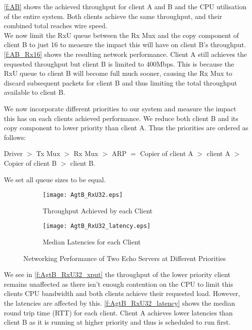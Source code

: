 \autoref{f:AB} shows the achieved throughput for client A and B and the CPU utilisation of the entire system. 
Both clients achieve the same throughput, and their combined total reaches wire speed.\\

We now limit the RxU queue between the Rx Mux and the copy component of client B to just 16 to measure 
the impact this will have on client B's throughput. \autoref{f:AB_Rx16} shows the resulting network performance.
Client A still achieves the requested throughput but client B is limited to 400Mbps. This is because the RxU queue
to client B will become full much sooner, causing the Rx Mux to discard subsequent packets for client B and thus
limiting the total throughput available to client B. 

We now incorporate different priorities to our system and measure the impact this has on each clients
achieved performance. We reduce both client B and its copy component to lower priority than client A. 
Thus the priorities are ordered as follows:\\ 

\centerline{Driver \(>\) Tx Mux  \(>\) Rx Mux \(>\) ARP \(=\) Copier of client A \(>\) client A \(>\) Copier of client B \(>\) client B.}

We set all queue sizes to be equal. 

\noindent\begin{figure}[H]
    \centering
	\begin{multicols}{2}
		\begin{subfigure}[b]{0.45\textwidth}
        \centering
        \texttt{[image: AgtB\_RxU32.eps]}
        \caption{Throughput Achieved by each Client}
        \label{f:AgtB_RxU32_xput}
    \end{subfigure}\qquad
    \begin{subfigure}[b]{0.45\textwidth}
        \vspace{39pt}
        \centering
        \texttt{[image: AgtB\_RxU32\_latency.eps]}
        \caption{Median Latencies for each Client}
        \label{f:AgtB_RxU32_latency}
    \end{subfigure}
\end{multicols}
\caption{Networking Performance of Two Echo Servers at Different Priorities}
\label{f:AgtB_RxU32}
\end{figure}

We see in \autoref{f:AgtB_RxU32_xput} the throughput of the lower priority client remains unaffected as there isn't enough
contention on the CPU to limit this clients CPU bandwidth and both clients achieve their requested load.
However, the latencies are affected by this. \autoref{f:AgtB_RxU32_latency} shows the median round trip time (RTT)
for each client. Client A achieves lower latencies than client B as it is running
at higher priority and thus is scheduled to run first.

